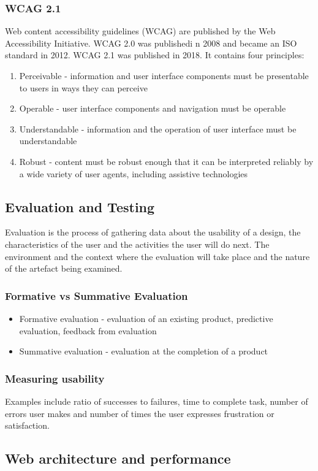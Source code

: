 \documentclass[a4paper]{article}
\theoremstyle{plain}
\theoremstyle{definition}
\theoremstyle{remark}
\begin{document}
\begin{flushleft}
	\subsubsection{WCAG 2.1}
	Web content accessibility guidelines (WCAG) are published by the Web Accessibility Initiative. WCAG 2.0 was publishedi n 2008 and became an ISO standard in 2012. WCAG 2.1 was published in 2018. It contains four principles:
	\begin{enumerate}
		\item Perceivable - information and user interface components must be presentable to users in ways they can perceive
		\item Operable - user interface components and navigation must be operable
		\item Understandable - information and the operation of user interface must be understandable
		\item Robust - content must be robust enough that it can be interpreted reliably by a wide variety of user agents, including assistive technologies
	\end{enumerate}
\subsection{Evaluation and Testing}
Evaluation is the process of gathering data about the usability of a design, the characteristics of the user and the activities the user will do next. The environment and the context where the evaluation will take place and the nature of the artefact being examined. 
\subsubsection{Formative vs Summative Evaluation}
\begin{itemize}
	\item Formative evaluation - evaluation of an existing product, predictive evaluation, feedback from evaluation
	\item Summative evaluation - evaluation at the completion of a product
\end{itemize}
\subsubsection{Measuring usability}
Examples include ratio of successes to failures, time to complete task, number of errors user makes and number of times the user expresses frustration or satisfaction. 
\subsection{Web architecture and performance}

\end{flushleft}
\end{document}
